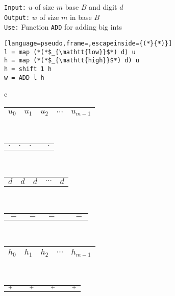 \begin{figure}
  \centering
  \begin{minipage}{0.45\textwidth}
    \small
    \texttt{Input:} $u$ of size $m$ base $B$ and digit $d$\\
    \texttt{Output:} $w$ of size $m$ in base $B$\\
    \texttt{Use:} Function \texttt{ADD} for adding big ints
\begin{lstlisting}[language=pseudo,frame=,escapeinside={(*}{*)}]
l = map (*(*$_{\mathtt{low}}$*) d) u
h = map (*(*$_{\mathtt{high}}$*) d) u
h = shift 1 h
w = ADD l h
\end{lstlisting}
  \end{minipage}
  \begin{minipage}{0.45\textwidth}
    \centering
    \footnotesize
    \begin{tabular}{c}
      \begin{tabular}{|C{0.7cm}|C{0.7cm}|C{0.7cm}|C{0.7cm}|C{0.7cm}|}
        \hline
        $u_0$ & $u_1$ & $u_2$ & $\cdots$ & $u_{m-1}$\\ 
        \hline
      \end{tabular}\\[-0.3ex]
      \begin{tabular}{C{0.7cm}C{0.7cm}C{0.7cm}C{0.7cm}C{0.7cm}}
        $\cdot$ & $\cdot$ & $\cdot$ & & $\cdot$\\ 
      \end{tabular}\\[-0.7ex]
      \begin{tabular}{C{0.7cm}C{0.7cm}C{0.7cm}C{0.7cm}C{0.7cm}}
        $d$ & $d$ &  $d$ & $\cdots$ &$d$ \\
      \end{tabular}\\[-0.5ex]
      \begin{tabular}{C{0.7cm}C{0.7cm}C{0.8cm}C{0.7cm}C{0.7cm}}
        $=$ & $=$ & $=$ &  & $=$  
      \end{tabular}\\
      \begin{tabular}{|C{0.7cm}|C{0.7cm}|C{0.7cm}|C{0.7cm}|C{0.7cm}|}
        \hline
        $h_{0}$ & $h_1$ & $h_2$ & $\cdots$ & $h_{m-1}$\\
        \hline
      \end{tabular}\\
      \begin{tabular}{C{0.15cm}C{0.15cm}C{0.15cm}C{0.15cm}C{0.15cm}C{0.15cm}C{0.15cm}}
        \diagonalarrowdown{}$_+$ & & \diagonalarrowdown{}$_+$ &  & \diagonalarrowdown{}$_+$  &  & \diagonalarrowdown{}$_+$ \\

\end{tabular}
\end{tabular}
\end{minipage}
\end{figure}
